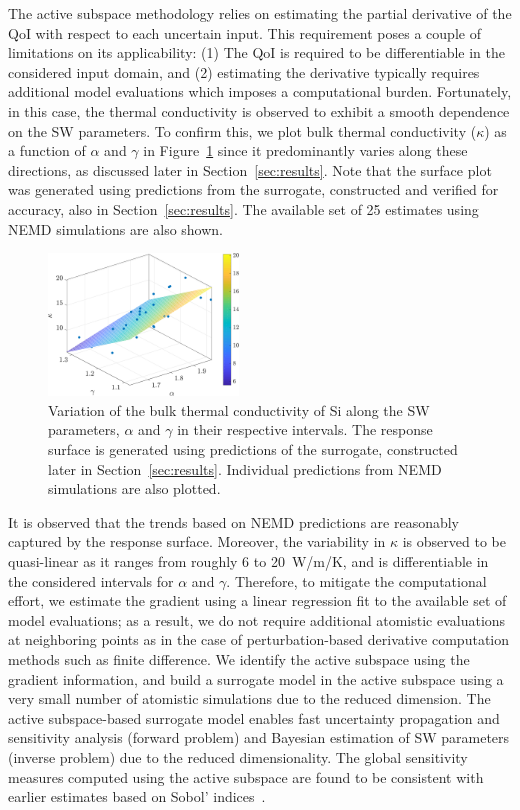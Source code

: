The active subspace methodology relies on estimating the partial derivative of the QoI 
with respect to each uncertain input. This requirement poses a couple of limitations on its
applicability: (1) The QoI is required to be differentiable in the considered input domain, and (2)
estimating the derivative typically requires additional model evaluations which
imposes a computational burden. Fortunately, in this case,
the thermal conductivity is observed to exhibit a smooth dependence on the SW parameters. 
To confirm this, we plot bulk thermal conductivity ($\kappa$) as a function of $\alpha$
and $\gamma$ in Figure~\ref{fig:kag} since it
predominantly varies along these directions, as discussed later
in Section~\ref{sec:results}. Note that the surface plot was generated using predictions from
the surrogate, constructed and verified for accuracy, also in Section~\ref{sec:results}.
The available set of 25 estimates using NEMD simulations are also shown. 
%
\begin{figure}[htbp]
\begin{center}
\includegraphics[width=0.45\textwidth]{./Figures/k_3D}
\caption{Variation of the bulk thermal conductivity of Si along the SW parameters, $\alpha$ 
and $\gamma$ in their respective intervals. The response surface is generated using predictions
of the surrogate, constructed later in Section~\ref{sec:results}. Individual predictions from NEMD
simulations are also plotted.}
\label{fig:kag}
\end{center}
\end{figure}
%
It is observed that the trends based on NEMD predictions are reasonably captured by
the response surface. Moreover, the variability in $\kappa$ is
observed to be quasi-linear as it ranges from roughly 6 to 20~W/m/K, and is  
differentiable in the considered intervals for $\alpha$ and $\gamma$.
Therefore, to mitigate the computational effort, we estimate the gradient
using a linear regression fit to the available set of model evaluations; as a result, we do not 
require additional atomistic evaluations at neighboring points as in the case of perturbation-based
derivative computation methods such as finite difference. We identify the active subspace
using the gradient information, and build a surrogate
model in the active subspace using a very small number of atomistic simulations
due to the reduced dimension. The active subspace-based surrogate model enables fast
uncertainty propagation and sensitivity analysis (forward problem) and Bayesian estimation
of SW parameters (inverse problem) due to the reduced dimensionality. 
The global sensitivity measures computed using the
active subspace are found to be consistent with earlier estimates 
based on Sobol' indices~\cite{Vohra:2018b}.

